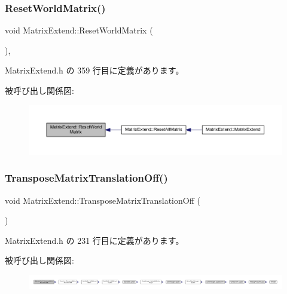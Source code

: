 \subsubsection{\texorpdfstring{Reset\+World\+Matrix()}{ResetWorldMatrix()}}
{\footnotesize\ttfamily void Matrix\+Extend\+::\+Reset\+World\+Matrix (\begin{DoxyParamCaption}{ }\end{DoxyParamCaption})\hspace{0.3cm}{\ttfamily [inline]}, {\ttfamily [private]}}



 Matrix\+Extend.\+h の 359 行目に定義があります。

被呼び出し関係図\+:\nopagebreak
\begin{figure}[H]
\begin{center}
\leavevmode
\includegraphics[width=350pt]{class_matrix_extend_a06d4bd42be11fba786917bef61a4e66d_icgraph}
\end{center}
\end{figure}
\mbox{\label{class_matrix_extend_ae567bb2d140dff892ed1b63f8de33ba9}} 
\subsubsection{\texorpdfstring{Transpose\+Matrix\+Translation\+Off()}{TransposeMatrixTranslationOff()}}
{\footnotesize\ttfamily void Matrix\+Extend\+::\+Transpose\+Matrix\+Translation\+Off (\begin{DoxyParamCaption}{ }\end{DoxyParamCaption})\hspace{0.3cm}{\ttfamily [inline]}}



 Matrix\+Extend.\+h の 231 行目に定義があります。

被呼び出し関係図\+:
\nopagebreak
\begin{figure}[H]
\begin{center}
\leavevmode
\includegraphics[width=350pt]{class_matrix_extend_ae567bb2d140dff892ed1b63f8de33ba9_icgraph}
\end{center}
\end{figure}
\mbox{\label{class_matrix_extend_a5aa7bce55ed92acb79d21fda51e83146}} 
